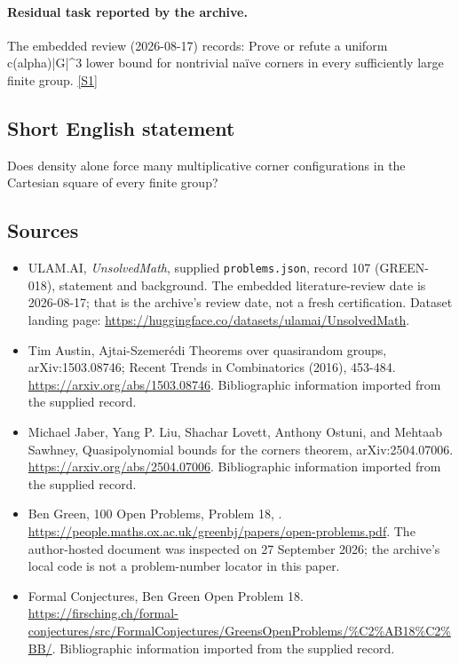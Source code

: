 \documentclass[11pt,a4paper]{article}
\newcommand{\sref}[2]{\hyperlink{source:#1:#2}{[S#2]}}
\begin{document}
\paragraph{Residual task reported by the archive.}

The embedded review (2026-08-17) records: Prove or refute a uniform c(alpha)|G|\textasciicircum{}3 lower bound for nontrivial naïve corners in every sufficiently large finite group. \sref{107}{1}

\subsection{Short English statement}

Does density alone force many multiplicative corner configurations in the Cartesian square of every finite group?

\subsection{Sources}

{\small

\begin{itemize}

\item[\hypertarget{source:107:1}{S1}] ULAM.AI, \emph{UnsolvedMath}, supplied \texttt{problems.json}, record 107 (GREEN-018), statement and background. The embedded literature-review date is 2026-08-17; that is the archive’s review date, not a fresh certification. Dataset landing page: \url{https://huggingface.co/datasets/ulamai/UnsolvedMath}.

\item[\hypertarget{source:107:2}{S2}] Tim Austin, Ajtai-Szemerédi Theorems over quasirandom groups, arXiv:1503.08746; Recent Trends in Combinatorics (2016), 453-484. \url{https://arxiv.org/abs/1503.08746}. Bibliographic information imported from the supplied record.

\item[\hypertarget{source:107:3}{S3}] Michael Jaber, Yang P. Liu, Shachar Lovett, Anthony Ostuni, and Mehtaab Sawhney, Quasipolynomial bounds for the corners theorem, arXiv:2504.07006. \url{https://arxiv.org/abs/2504.07006}. Bibliographic information imported from the supplied record.

\item[\hypertarget{source:107:4}{S4}] Ben Green, 100 Open Problems, Problem 18, . \url{https://people.maths.ox.ac.uk/greenbj/papers/open-problems.pdf}. The author-hosted document was inspected on 27 September 2026; the archive’s local code is not a problem-number locator in this paper.

\item[\hypertarget{source:107:5}{S5}] Formal Conjectures, Ben Green Open Problem 18. \url{https://firsching.ch/formal-conjectures/src/FormalConjectures/GreensOpenProblems/%C2%AB18%C2%BB/}. Bibliographic information imported from the supplied record.

\end{itemize}

}

\label{end:107}
\end{document}

